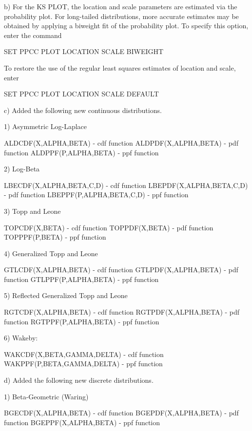 {    b) For the KS PLOT, the location and scale parameters are
       estimated via the probability plot.  For long-tailed
       distributions, more accurate estimates may be obtained
       by applying a biweight fit of the probability plot.
       To specify this option, enter the command

         SET PPCC PLOT LOCATION SCALE BIWEIGHT

       To restore the use of the regular least squares
       estimates of location and scale, enter

         SET PPCC PLOT LOCATION SCALE DEFAULT

    c) Added the following new continuous distributions.

        1) Asymmetric Log-Laplace
 
           ALDCDF(X,ALPHA,BETA)          - cdf function
           ALDPDF(X,ALPHA,BETA)          - pdf function
           ALDPPF(P,ALPHA,BETA)          - ppf function
 
        2) Log-Beta
 
           LBECDF(X,ALPHA,BETA,C,D)      - cdf function
           LBEPDF(X,ALPHA,BETA,C,D)      - pdf function
           LBEPPF(P,ALPHA,BETA,C,D)      - ppf function
 
        3) Topp and Leone
 
           TOPCDF(X,BETA)                - cdf function
           TOPPDF(X,BETA)                - pdf function
           TOPPPF(P,BETA)                - ppf function
 
        4) Generalized Topp and Leone
 
           GTLCDF(X,ALPHA,BETA)          - cdf function
           GTLPDF(X,ALPHA,BETA)          - pdf function
           GTLPPF(P,ALPHA,BETA)          - ppf function
 
        5) Reflected Generalized Topp and Leone
 
           RGTCDF(X,ALPHA,BETA)          - cdf function
           RGTPDF(X,ALPHA,BETA)          - pdf function
           RGTPPF(P,ALPHA,BETA)          - ppf function
 
        6) Wakeby:
 
           WAKCDF(X,BETA,GAMMA,DELTA)    - cdf function
           WAKPPF(P,BETA,GAMMA,DELTA)    - ppf function
 
    d) Added the following new discrete distributions.

        1) Beta-Geometric (Waring)
 
           BGECDF(X,ALPHA,BETA)         - cdf function
           BGEPDF(X,ALPHA,BETA)         - pdf function
           BGEPPF(X,ALPHA,BETA)         - ppf function
 
}

